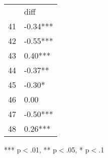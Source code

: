 \documentclass{article}
\begin{document}
\begin{table}[!h]
\centering
\begin{tabular}{ll}
\cline{1-2}
\multicolumn{1}{|l}{} &
  \multicolumn{1}{|l|}{diff} \\
\cline{1-2}
\multicolumn{1}{|l}{41} &
  \multicolumn{1}{|l|}{-0.34***} \\
\cline{1-2}
\multicolumn{1}{|l}{42} &
  \multicolumn{1}{|l|}{-0.55***} \\
\cline{1-2}
\multicolumn{1}{|l}{43} &
  \multicolumn{1}{|l|}{0.40***} \\
\cline{1-2}
\multicolumn{1}{|l}{44} &
  \multicolumn{1}{|l|}{-0.37**} \\
\cline{1-2}
\multicolumn{1}{|l}{45} &
  \multicolumn{1}{|l|}{-0.30*} \\
\cline{1-2}
\multicolumn{1}{|l}{46} &
  \multicolumn{1}{|l|}{0.00} \\
\cline{1-2}
\multicolumn{1}{|l}{47} &
  \multicolumn{1}{|l|}{-0.50***} \\
\cline{1-2}
\multicolumn{1}{|l}{48} &
  \multicolumn{1}{|l|}{0.26***} \\
\cline{1-2}
\end{tabular}

\footnotesize{
*** p$<$.01, ** p$<$.05, * p$<$.1
}
\end{table}
\end{document}
